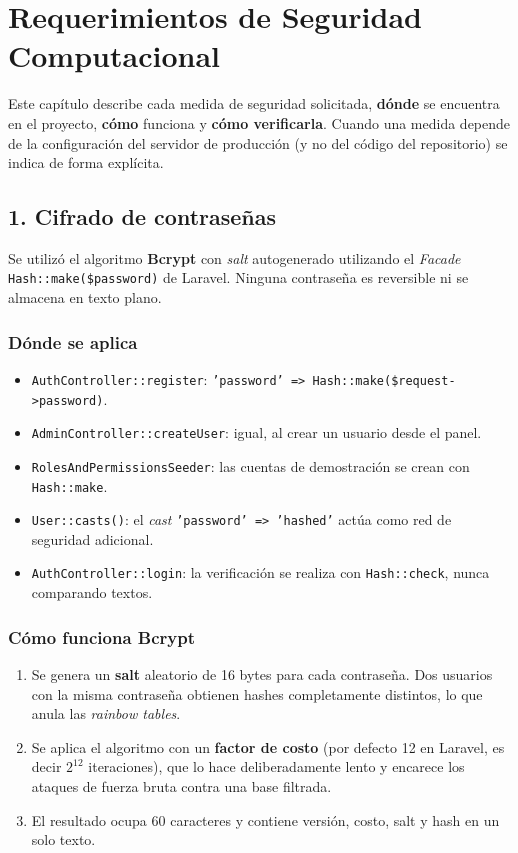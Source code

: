 \section{Requerimientos de Seguridad Computacional}
Este capítulo describe cada medida de seguridad solicitada, \textbf{dónde} se encuentra en el proyecto, \textbf{cómo} funciona y \textbf{cómo verificarla}. Cuando una medida depende de la configuración del servidor de producción (y no del código del repositorio) se indica de forma explícita.

\subsection{1. Cifrado de contraseñas}
Se utilizó el algoritmo \textbf{Bcrypt} con \textit{salt} autogenerado utilizando el \textit{Facade} \texttt{Hash::make(\$password)} de Laravel. Ninguna contraseña es reversible ni se almacena en texto plano.

\subsubsection{Dónde se aplica}
\begin{itemize}
    \item \texttt{AuthController::register}: \texttt{'password' => Hash::make(\$request->password)}.
    \item \texttt{AdminController::createUser}: igual, al crear un usuario desde el panel.
    \item \texttt{RolesAndPermissionsSeeder}: las cuentas de demostración se crean con \texttt{Hash::make}.
    \item \texttt{User::casts()}: el \emph{cast} \texttt{'password' => 'hashed'} actúa como red de seguridad adicional.
    \item \texttt{AuthController::login}: la verificación se realiza con \texttt{Hash::check}, nunca comparando textos.
\end{itemize}

\subsubsection{Cómo funciona Bcrypt}
\begin{enumerate}
    \item Se genera un \textbf{salt} aleatorio de 16 bytes para cada contraseña. Dos usuarios con la misma contraseña obtienen hashes completamente distintos, lo que anula las \emph{rainbow tables}.
    \item Se aplica el algoritmo con un \textbf{factor de costo} (por defecto 12 en Laravel, es decir $2^{12}$ iteraciones), que lo hace deliberadamente lento y encarece los ataques de fuerza bruta contra una base filtrada.
    \item El resultado ocupa 60 caracteres y contiene versión, costo, salt y hash en un solo texto.
\end{enumerate}

